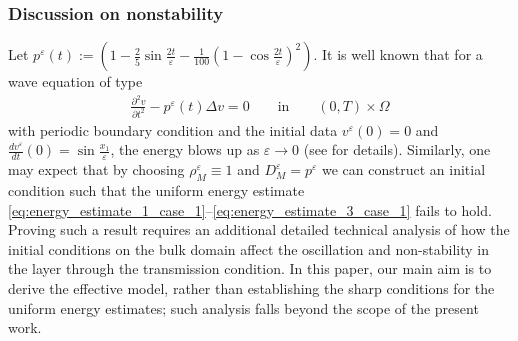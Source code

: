 \documentclass[11pt]{article}
\def\es{\varepsilon}
\def\p{\partial}
\newcommand{\V}{\textcolor{blue}}
\begin{document}
\subsubsection{Discussion on nonstability}
   Let $p^\es(t):=\left(1-\frac{2}{5}\sin{\frac{2t}{\es}}-\frac{1}{100}(1-\cos{\frac{2t}{\es}})^2\right)$.  It is well known that for a wave equation of type 
        \begin{align*}
            \frac{\p^2 v}{\p t^2}-p^\es(t)\Delta v=0 \qquad\mbox{in}\qquad (0,T)\times\Omega
        \end{align*}
       with periodic boundary condition and the initial data $v^\es(0)=0$ and $\frac{d v^\es}{dt}(0)=\sin{\frac{x_1}{\es}}$, the energy blows up as $\es\rightarrow 0$ (see \cite{colombini1984hyperbolic} for details). Similarly, one may expect that by choosing $\rho_M^\es\equiv 1$ and $D_M^\es=p^\es$ we can construct an initial condition such that the uniform energy estimate \eqref{eq:energy_estimate_1_case_1}--\eqref{eq:energy_estimate_3_case_1} fails to hold. Proving such a result requires an  additional detailed technical analysis of how the initial conditions on the bulk domain affect the oscillation and non-stability in the layer through the transmission condition. In this paper, our main aim is to derive the effective model, rather than establishing the sharp conditions for the uniform energy estimates;  such analysis falls beyond the scope of the present work.
\end{document}
